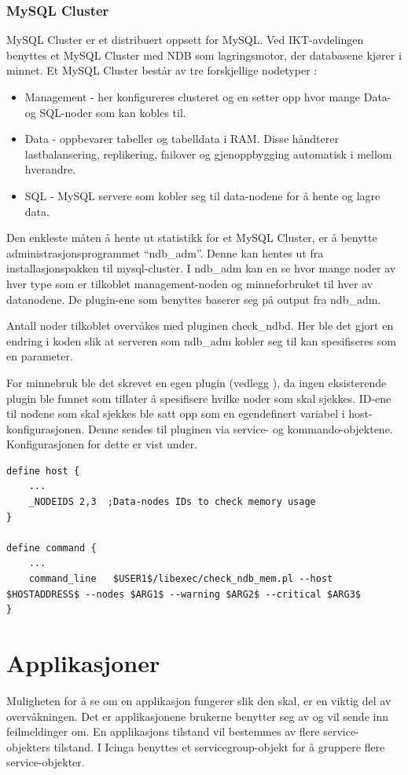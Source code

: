 \subsubsection{MySQL Cluster}
MySQL Cluster er et distribuert oppsett for MySQL. Ved IKT-avdelingen benyttes et MySQL Cluster med NDB som lagringsmotor, der databasene kjører i minnet. Et MySQL Cluster består av tre forskjellige nodetyper \cite{ndbinformation}:
\begin{itemize}
	\item Management - her konfigureres clusteret og en setter opp hvor mange Data- og SQL-noder som kan kobles til.
	\item Data - oppbevarer tabeller og tabelldata i RAM. Disse håndterer lastbalansering, replikering, failover og gjenoppbygging automatisk i mellom hverandre.
	\item SQL - MySQL servere som kobler seg til data-nodene for å hente og lagre data.
\end{itemize}

Den enkleste måten å hente ut statistikk for et MySQL Cluster, er å benytte administrasjonsprogrammet ``ndb\_adm''. Denne kan hentes ut fra installasjonspakken til mysql-cluster\cite{ndbdownload}. I ndb\_adm kan en se hvor mange noder av hver type som er tilkoblet management-noden og minneforbruket til hver av datanodene. De plugin-ene som benyttes baserer seg på output fra ndb\_adm.

Antall noder tilkoblet overvåkes med pluginen check\_ndbd\cite{ndbnode}. Her ble det gjort en endring i koden slik at serveren som ndb\_adm kobler seg til kan spesifiseres som en parameter.

For minnebruk ble det skrevet en egen plugin (vedlegg \cite{check_ndb_mem}), da ingen eksisterende plugin ble funnet som tillater å spesifisere hvilke noder som skal sjekkes. ID-ene til nodene som skal sjekkes ble satt opp som en egendefinert variabel i host-konfigurasjonen. Denne sendes til pluginen via service- og kommando-objektene. Konfigurasjonen for dette er vist under.

\begin{lstlisting}[style=example]
define host {
	...
	_NODEIDS 2,3  ;Data-nodes IDs to check memory usage
}

define command {
	...
	command_line   $USER1$/libexec/check_ndb_mem.pl --host $HOSTADDRESS$ --nodes $ARG1$ --warning $ARG2$ --critical $ARG3$
}
\end{lstlisting}
\section{Applikasjoner}
Muligheten for å se om en applikasjon fungerer slik den skal, er en viktig del av overvåkningen. Det er applikasjonene brukerne benytter seg av og vil sende inn feilmeldinger om. En applikasjons tilstand vil bestemmes av flere service-objekters tilstand. I Icinga benyttes et servicegroup-objekt for å gruppere flere service-objekter.

